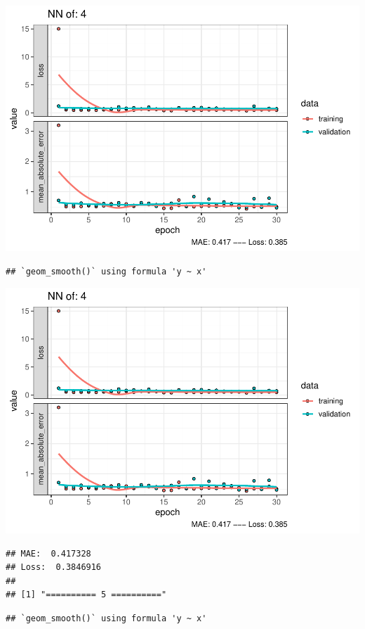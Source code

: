\documentclass[
]{article}
\begin{document}
\includegraphics{project-code_files/figure-latex/unnamed-chunk-18-7.pdf}

\begin{verbatim}
## `geom_smooth()` using formula 'y ~ x'
\end{verbatim}

\includegraphics{project-code_files/figure-latex/unnamed-chunk-18-8.pdf}

\begin{verbatim}
## MAE:  0.417328
## Loss:  0.3846916 
## 
## [1] "========== 5 =========="
\end{verbatim}

\begin{verbatim}
## `geom_smooth()` using formula 'y ~ x'
\end{verbatim}
\end{document}
